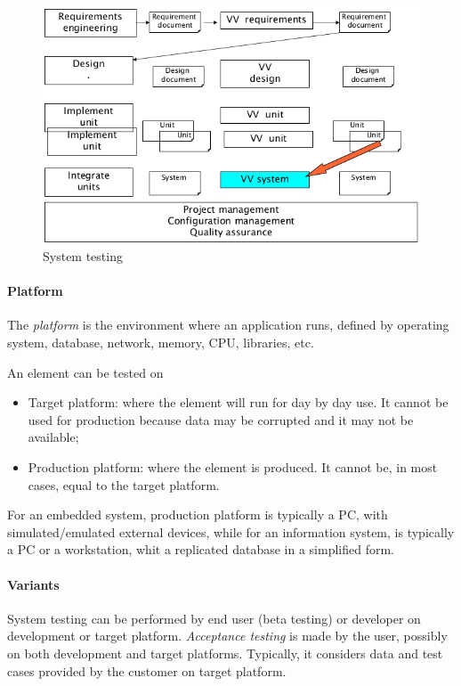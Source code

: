 \begin{figure}[hbtp]
\centering
\includegraphics[scale=0.35]{images/system_testing.png}
\caption{System testing}
\end{figure}

\paragraph{Platform} The \emph{platform} is the environment where an application runs, defined by operating system, database, network, memory, CPU, libraries, etc.

An element can be tested on
\begin{itemize}
\item Target platform: where the element will run for day by day use. It cannot be used for production because data may be corrupted and it may not be available;
\item Production platform: where the element is produced. It cannot be, in most cases, equal to the target platform.
\end{itemize}
For an embedded system, production platform is typically a PC, with simulated/emulated external devices, while for an information system, is typically a PC or a workstation, whit a replicated database in a simplified form.

\paragraph{Variants}
System testing can be performed by end user (beta testing) or developer on development or target platform. \emph{Acceptance testing} is made by the user, possibly on both development and target platforms. Typically, it considers data and test cases provided by the customer on target platform.

